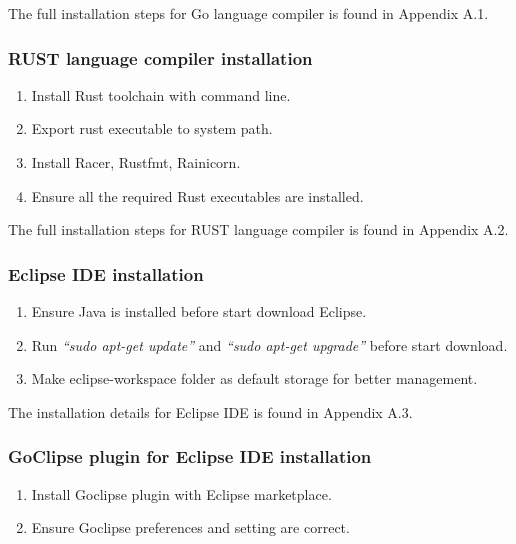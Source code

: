 The full installation steps for Go language compiler is found in Appendix A.1.
\pagebreak

\subsubsection{RUST language compiler installation}

\begin{enumerate}[topsep=0pt,itemsep=-1ex,partopsep=1ex,parsep=1.5ex]
    \item Install Rust toolchain with command line. 
    \item Export rust executable to system path. 
    \item Install Racer, Rustfmt, Rainicorn.
    \item Ensure all the required Rust executables are installed. 
	
\end{enumerate}

The full installation steps for RUST language compiler is found in Appendix A.2.

\subsubsection{Eclipse IDE installation}

\begin{enumerate}[topsep=0pt,itemsep=-1ex,partopsep=1ex,parsep=1.5ex]
    \item Ensure Java is installed before start download Eclipse.
    \item Run \textit{“sudo apt-get update”} and \textit{“sudo apt-get upgrade”} before start download. 
    \item Make eclipse-workspace folder as default storage for better management. 

\end{enumerate}

The installation details for Eclipse IDE is found in Appendix A.3.

\subsubsection{GoClipse plugin for Eclipse IDE installation}

\begin{enumerate}[topsep=0pt,itemsep=-1ex,partopsep=1ex,parsep=1.5ex]
	\item Install Goclipse plugin with Eclipse marketplace.
	\item Ensure Goclipse preferences and setting are correct.  
\end{enumerate}

